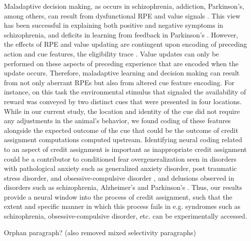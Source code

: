 \documentclass[11pt]{article}
\let\cite=\citep
\begin{document}
{Maladaptive decision making, as occurs in schizophrenia, addiction, Parkinson’s, among others, can result from dysfunctional RPE and value signals \cite{Frank2004,Gradin2011,Maia2011}. This view has been successful in explaining both positive and negative symptoms in schizophrenia, and deficits in learning from feedback in Parkinson’s \cite{Frank2004,Gradin2011}. However, the effects of RPE and value updating are contingent upon encoding of preceding action and cue features, the eligibility trace \cite{Lee2012,sutton1998}. Value updates can only be performed on these aspects of preceding experience that are encoded when the update occurs. Therefore, maladaptive learning and decision making can result from not only aberrant RPEs but also from altered cue feature encoding. For instance, on this task the environmental stimulus that signaled the availability of reward was conveyed by two distinct cues that were presented in four locations. While in our current study, the location and identity of the cue did not require any adjustments in the animal’s behavior, we found coding of these features alongside the expected outcome of the cue that could be the outcome of credit assignment computations computed upstream. Identifying neural coding related to an aspect of credit assignment is important as inappropriate credit assignment could be a contributor to conditioned fear overgeneralization seen in disorders with pathological anxiety such as generalized anxiety disorder, post traumatic stress disorder, and obsessive-compulsive disorder \cite{Kaczkurkin2013,Kaczkurkin2017,Lissek2014}, and delusions observed in disorders such as schizophrenia, Alzheimer’s and Parkinson’s \cite{Corlett2010,Kapur2003}. Thus, our results provide a neural window into the process of credit assignment, such that the extent and specific manner in which this process fails in e.g. syndromes such as schizophrenia, obsessive-compulsive disorder, etc. can be experimentally accessed.

Orphan paragraph? (also removed mixed selectivity paragraphs)

}
\end{document}
